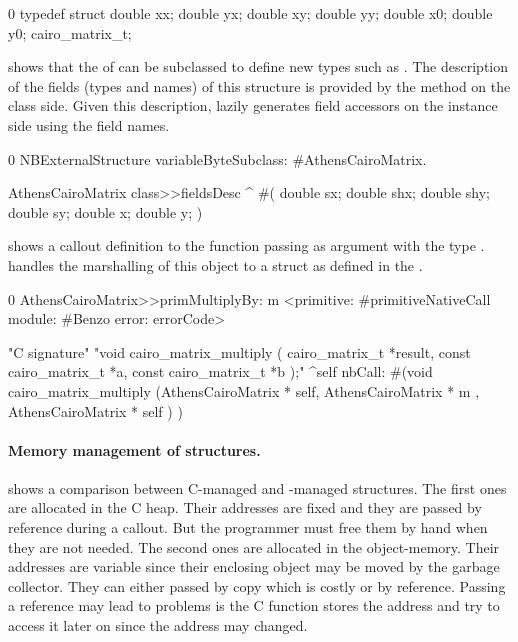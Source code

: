 \begin{numstcode}[
	label={lst:ffi-cairo_c_definition},
	caption={Example external type to convert back and forth with the Cairo library}]{0}
typedef struct {
    double xx; double yx;
    double xy; double yy;
    double x0; double y0;
} cairo_matrix_t;
\end{numstcode}

\noindent {} shows that the  of \NBFFI can be subclassed to define new types such as .
The description of the fields (types and names) of this structure is provided by the  method on the class side.
Given this description, \NB lazily generates field accessors on the instance side using the field names.

\begin{numstcode}[
	label={lst:ffi-AthensCairoMatrix},
	caption={Example of \NBFFI definition of an \ttt{ExternalStructure}}]{0}
NBExternalStructure
    variableByteSubclass: #AthensCairoMatrix.

AthensCairoMatrix class>>fieldsDesc
	^ #(  double sx; double shx;
		  double shy; double sy;
		  double x; double y;  )
\end{numstcode}

\noindent {} shows a callout definition to the
  function passing  as argument with the type .
\NB handles the marshalling of this object to a struct as defined in the .

\begin{numstcode}[
	label={lst:ffi-cairoCallouts},
	caption={Example of callouts using \ttt{cairo\_matrix\_t}}]{0}
AthensCairoMatrix>>primMultiplyBy: m
	<primitive: #primitiveNativeCall
	 module: #Benzo
     error: errorCode>

"C signature"
"void cairo_matrix_multiply (
                     cairo_matrix_t *result,
                     const cairo_matrix_t *a,
                     const cairo_matrix_t *b );"
	^self nbCall: #(void   cairo_matrix_multiply
		(AthensCairoMatrix * self,
		AthensCairoMatrix * m ,
		AthensCairoMatrix * self ) )
\end{numstcode}


\paragraph{Memory management of structures.}
 shows a comparison between C-managed and \PH-managed structures.
The first ones are allocated in the C heap.
Their addresses are fixed and they are passed by reference during a callout.
But the programmer must free them by hand when they are not needed.
The second ones are allocated in the \PH object-memory.
Their addresses are variable since their enclosing object may be moved by the garbage collector.
They can either passed by copy which is costly or by reference.
Passing a reference may lead to problems is the C function stores the address and try to access it later on since the address may changed.



